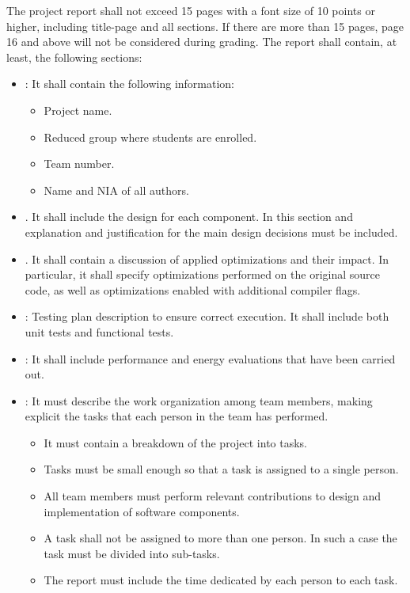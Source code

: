 The project report shall not exceed 15 pages with a font size of 10 points
or higher, including title-page and all sections. If there are more than
15 pages, page 16 and above will not be considered during grading.
The report shall contain, at least, the following sections:

\begin{itemize}

\item {}: It shall contain the following information:
  \begin{itemize}
    \item Project name.
    \item Reduced group where students are enrolled.
    \item Team number.
    \item Name and NIA of all authors.
  \end{itemize}

\item {}. 
      It shall include the design for each component.
      In this section and explanation and justification for the main
      design decisions must be included.

\item {}. 
      It shall contain a discussion of applied optimizations and their
      impact. In particular, it shall specify optimizations performed
      on the original source code, as well as optimizations enabled
      with additional compiler flags.

\item {}: 
      Testing plan description to ensure correct execution.
      It shall include both unit tests and functional tests.

\item {}:
      It shall include performance and energy evaluations that have been
      carried out.

\item {}:
      It must describe the work organization among team members, 
      making explicit the tasks that each person in the team has performed.
        \begin{itemize}
          \item It must contain a breakdown of the project into tasks.
          \item Tasks must be small enough so that a task is assigned to
                a single person.
          \item All team members must perform relevant contributions to design
                and implementation of software components.
          \item A task shall not be assigned to more than one person.
                In such a case the task must be divided into sub-tasks.
          \item The report must include the time dedicated by each person to each task.
        \end{itemize}


\end{itemize}
